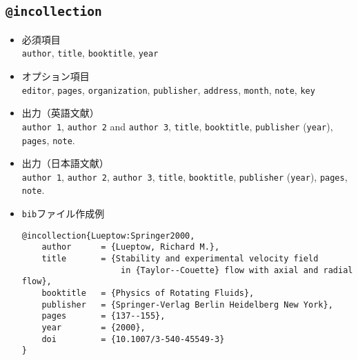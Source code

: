 \documentclass[a4paper,fleqn,uplatex,dvipdfmx]{jsarticle}
\makeatletter
\newcommand{\ttincollection}{\texttt{@incollection}}
\makeatother
\begin{document}
\subsection{\ttincollection}
\label{ssec:incollection}
\begin{screen}
    \begin{itemize}
        \item 必須項目 \\
        \verb|author|, \verb|title|, \verb|booktitle|, \verb|year|
        \item オプション項目 \\
        \verb|editor|, \verb|pages|, \verb|organization|, \verb|publisher|, \verb|address|, \verb|month|, \verb|note|, \verb|key|
        \item 出力（英語文献） \\
            \colorbox[gray]{0.8}{\texttt{author 1}}, \colorbox[gray]{0.8}{\texttt{author 2}} and \colorbox[gray]{0.8}{\texttt{author 3}}, \colorbox[gray]{0.8}{\texttt{title}}, \colorbox[gray]{0.8}{\texttt{booktitle}}, \colorbox[gray]{0.8}{\texttt{publisher}} (\colorbox[gray]{0.8}{\texttt{year}}), \colorbox[gray]{0.8}{\texttt{pages}}, \colorbox[gray]{0.8}{\texttt{note}}.
        \item 出力（日本語文献） \\
            \colorbox[gray]{0.8}{\texttt{author 1}}, \colorbox[gray]{0.8}{\texttt{author 2}}, \colorbox[gray]{0.8}{\texttt{author 3}}, \colorbox[gray]{0.8}{\texttt{title}}, \colorbox[gray]{0.8}{\texttt{booktitle}}, \colorbox[gray]{0.8}{\texttt{publisher}} (\colorbox[gray]{0.8}{\texttt{year}}), \colorbox[gray]{0.8}{\texttt{pages}}, \colorbox[gray]{0.8}{\texttt{note}}.
        \item \verb|bib|ファイル作成例 \vspace{-3mm}
\begin{verbatim}
@incollection{Lueptow:Springer2000,
    author      = {Lueptow, Richard M.},
    title       = {Stability and experimental velocity field 
                    in {Taylor--Couette} flow with axial and radial flow},
    booktitle   = {Physics of Rotating Fluids},
    publisher   = {Springer-Verlag Berlin Heidelberg New York},
    pages       = {137--155},
    year        = {2000},
    doi         = {10.1007/3-540-45549-3}
}
\end{verbatim}
    \end{itemize}
\end{screen}
\end{document}
